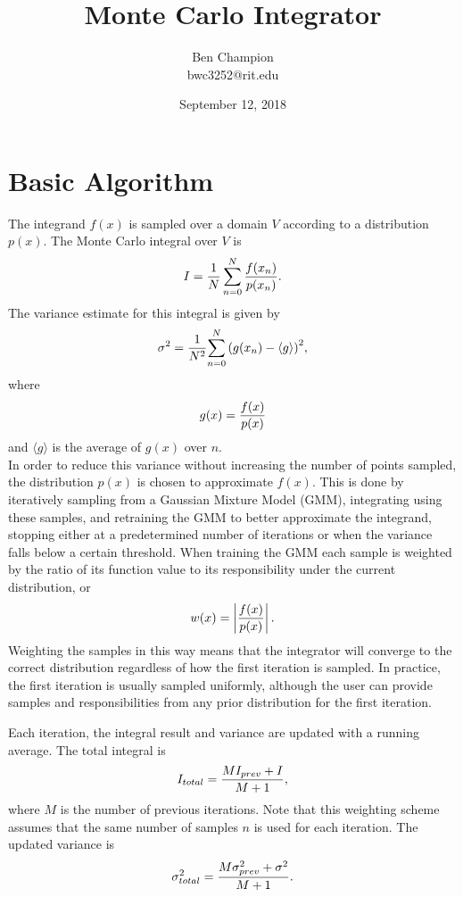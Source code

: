 \documentclass{article}
\title{Monte Carlo Integrator}
\date{September 12, 2018}
\author{Ben Champion \\ bwc3252@rit.edu}
\begin{document}
\maketitle

\section{Basic Algorithm}

The integrand $f(x)$ is sampled over a domain $V$ according to a distribution
$p(x)$. The Monte Carlo integral over $V$ is
\begin{equation}
    I = {{1 \over N} \sum_{n=0}^{N} {f(x_n) \over {p(x_n)}}}.
\end{equation}
The variance estimate for this integral is given by
\begin{equation}
    \sigma^2 = {1 \over N^2}{\sum\limits_{n=0}^{N} {(g(x_n) - \langle g \rangle)}^2},
\end{equation}
where
\begin{equation}
    g(x) = {f(x) \over {p(x)}}
\end{equation}
and $\langle g \rangle$ is the average of $g(x)$ over $n$. \\

In order to reduce this variance without increasing the number of points
sampled, the distribution $p(x)$ is chosen to approximate $f(x)$. This is done
by iteratively sampling from a Gaussian Mixture Model (GMM), integrating using
these samples, and retraining the GMM to better approximate the integrand,
stopping either at a predetermined number of iterations or when the variance
falls below a certain threshold. When training the GMM each sample is weighted
by the ratio of its function value to its responsibility under the current
distribution, or
\begin{equation}
    w(x) = \left| {f(x) \over p(x)} \right|.
\end{equation}
Weighting the samples in this way means that the integrator will converge to
the correct distribution regardless of how the first iteration is sampled. In
practice, the first iteration is usually sampled uniformly, although the user
can provide samples and responsibilities from any prior distribution for the
first iteration.

Each iteration, the integral result and variance are updated with a running
average. The total integral is
\begin{equation}
    I_{total} = {{M I_{prev} + I} \over {M + 1}},
\end{equation}
where $M$ is the number of previous iterations. Note that this weighting scheme
assumes that the same number of samples $n$ is used for each iteration. The
updated variance is
\begin{equation}
    \sigma^2_{total} = {{M \sigma^2_{prev} + \sigma^2} \over {M + 1}}.
\end{equation}
\end{document}
